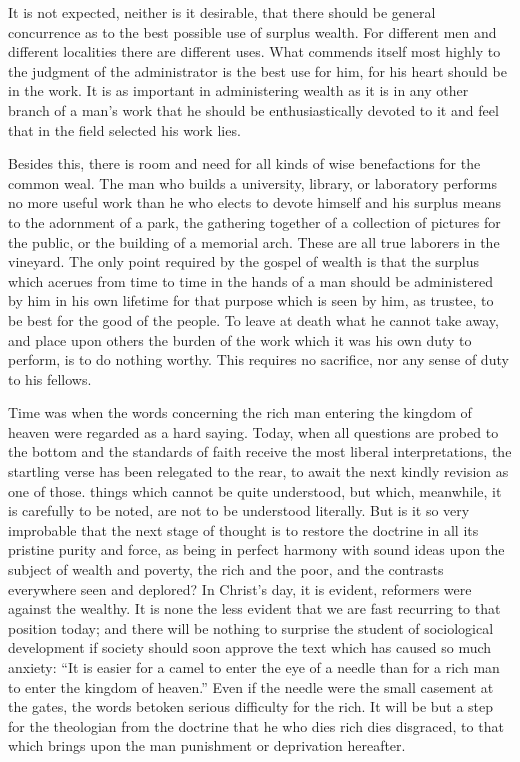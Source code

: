 \documentclass[11pt,openany]{book}
\begin{document}
It is not expected, neither is it desirable, that there should be general concurrence as to the best possible use of surplus wealth. For different men and different localities there are different uses. What commends itself most highly to the judgment of the administrator is the best use for him, for his heart should be in the work. It is as important in administering wealth as it is in any other branch of a man's work that he should be enthusiastically devoted to it and feel that in the field selected his work lies.

Besides this, there is room and need for all kinds of wise benefactions for the common weal. The man who builds a university, library, or laboratory performs no more useful work than he who elects to devote himself and his surplus means to the adornment of a park, the gathering together of a collection of pictures for the public, or the building of a memorial arch. These are all true laborers in the vineyard. The only point required by the gospel of wealth is that the surplus which acerues from time to time in the hands of a man should be administered by him in his own lifetime for that purpose which is seen by him, as trustee, to be best for the good of the people. To leave at death what he cannot take away, and place upon others the burden of the work which it was his own duty to perform, is to do nothing worthy. This requires no sacrifice, nor any sense of duty to his fellows.

Time was when the words concerning the rich man entering the kingdom of heaven were regarded as a hard saying. Today, when all questions are probed to the bottom and the standards of faith receive the most liberal interpretations, the startling verse has been relegated to the rear, to await the next kindly revision as one of those. things which cannot be quite understood, but which, meanwhile, it is carefully to be noted, are not to be understood literally. But is it so very improbable that the next stage of thought is to restore the doctrine in all its pristine purity and force, as being in perfect harmony with sound ideas upon the subject of wealth and poverty, the rich and the poor, and the contrasts everywhere seen and deplored? In Christ's day, it is evident, reformers were against the wealthy. It is none the less evident that we are fast recurring to that position today; and there will be nothing to surprise the student of sociological development if society should soon approve the text which has caused so much anxiety: ``It is easier for a camel to enter the eye of a needle than for a rich man to enter the kingdom of heaven.'' Even if the needle were the small casement at the gates, the words betoken serious difficulty for the rich. It will be but a step for the theologian from the doctrine that he who dies rich dies disgraced, to that which brings upon the man punishment or deprivation hereafter.
\end{document}
